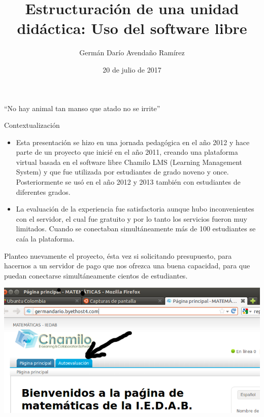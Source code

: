 \documentclass{beamer}
\title{Estructuraci\'on de una unidad did\'actica: Uso del software libre}
\author{Germán Darío Avendaño Ramírez}
\institute[Universities of Somewhere and Elsewhere] 
{
  \inst{}%
  Área de Matemáticas\\
  I.E.D. Arborizadora Baja
  }
\date{20 de julio de 2017}
\begin{document}
\begin{frame}
  \titlepage
\end{frame}

\begin{frame}{``No hay animal tan manso que atado no se irrite''}
  \tableofcontents
\end{frame}



\begin{frame}{Contextualización}
\begin{itemize}
\item Esta presentación se hizo en una jornada pedagógica en el año 2012 y hace parte de un proyecto que inicié en el año 2011, creando una plataforma virtual basada en el software libre Chamilo LMS (Learning Management System) y que fue utilizada por estudiantes de grado noveno y once. Posteriormente se usó en el año 2012 y 2013 también con estudiantes de diferentes grados.  
\item La evaluación de la experiencia fue satisfactoria aunque hubo inconvenientes con el servidor, el cual fue gratuito y por lo tanto los servicios fueron muy limitados. Cuando se conectaban simultáneamente más de 100 estudiantes se caía la plataforma.
\end{itemize}
\end{frame}
\begin{frame}
Planteo nuevamente el proyecto, ésta vez si solicitando presupuesto, para hacernos a un servidor de pago que nos ofrezca una buena capacidad, para que puedan conectarse simultáneamente cientos de estudiantes.
\begin{center}
\includegraphics[scale=.35]{Images/Captura01.png} 
\end{center}
\end{frame}
\end{document}
